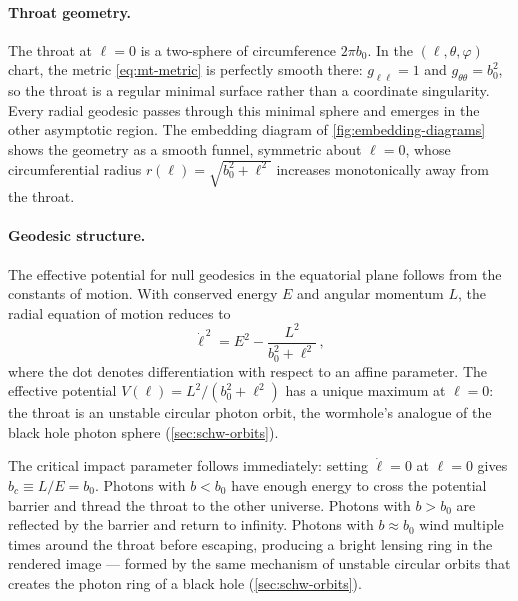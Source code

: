 \paragraph{Throat geometry.}

The throat at $\ell = 0$ is a two-sphere of circumference
$2\pi b_0$.  In the $(\ell, \theta, \varphi)$ chart, the metric
\cref{eq:mt-metric} is perfectly smooth there: $g_{\ell\ell} = 1$
and $g_{\theta\theta} = b_0^2$, so the throat is a regular minimal
surface rather than a coordinate singularity.  Every radial geodesic
passes through this minimal sphere and emerges in the other
asymptotic region.  The embedding diagram of
\cref{fig:embedding-diagrams} shows the geometry as a smooth funnel,
symmetric about $\ell = 0$, whose circumferential radius
$r(\ell) = \sqrt{b_0^2 + \ell^2}$ increases monotonically away from
the throat.

\paragraph{Geodesic structure.}

The effective potential for null geodesics in the equatorial plane
follows from the constants of motion.  With conserved energy $E$ and
angular momentum $L$, the radial equation of motion reduces to
%
\begin{equation}
  \dot{\ell}^{\,2} = E^2 - \frac{L^2}{b_0^2 + \ell^2} \,,
  \label{eq:mt-null-radial}
\end{equation}
%
where the dot denotes differentiation with respect to an affine
parameter.  The effective potential
$V(\ell) = L^2/(b_0^2 + \ell^2)$ has a unique maximum at
$\ell = 0$: the throat is an unstable circular photon orbit, the
wormhole's analogue of the black hole photon sphere
(\cref{sec:schw-orbits}).

The critical impact parameter follows immediately: setting
$\dot{\ell} = 0$ at $\ell = 0$ gives $b_c \equiv L/E = b_0$.
Photons with $b < b_0$ have enough energy to cross the potential
barrier and thread the throat to the other universe.  Photons with
$b > b_0$ are reflected by the barrier and return to infinity.
Photons with $b \approx b_0$ wind multiple times around the throat
before escaping, producing a bright lensing ring in the rendered
image --- formed by the same mechanism of unstable circular orbits
that creates the photon ring of a black hole
(\cref{sec:schw-orbits}).

